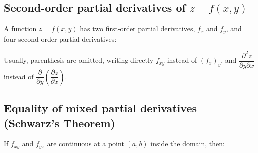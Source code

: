 \documentclass{article}
\begin{document}
\subsection{Second-order partial derivatives of $z = f(x,y)$}
A function $z=f(x,y)$ has two first-order partial derivatives, $f_x$ and $f_y$,
and four second-order partial derivatives:

Usually, parenthesis are omitted, writing directly $f_{xy}$ instead of $(f_x)_y$, and $\dfrac{\partial^2 z}{\partial y \partial x}$
instead of $\dfrac{\partial}{\partial y} \left(\dfrac{\partial z}{\partial x}\right)$.

\subsection{Equality of mixed partial derivatives (Schwarz's Theorem)}
If $f_{xy}$ and $f_{yx}$ are continuous at a point $(a,b)$ inside the domain, then:
\end{document}
